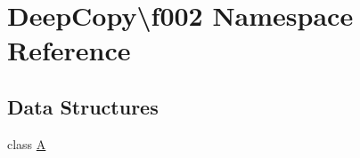\hypertarget{namespace_deep_copy_1_1f002}{}\section{Deep\+Copy\textbackslash{}f002 Namespace Reference}
\label{namespace_deep_copy_1_1f002}
\subsection*{Data Structures}
\begin{DoxyCompactItemize}
\item 
class \mbox{\hyperlink{class_deep_copy_1_1f002_1_1_a}{A}}
\end{DoxyCompactItemize}
